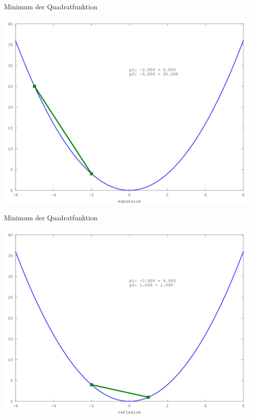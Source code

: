 \documentclass[\outputformat]{beamer}
\begin{document}
\begin{frame}{Minimum der Quadratfunktion}
	\begin{center}
		\includegraphics[height=0.75\paperheight]{../bilder/Quadrat/sinx_x002.png}
	\end{center}
\end{frame}
\begin{frame}{Minimum der Quadratfunktion}
	\begin{center}
		\includegraphics[height=0.75\paperheight]{../bilder/Quadrat/sinx_x003.png}
	\end{center}
\end{frame}
\end{document}
